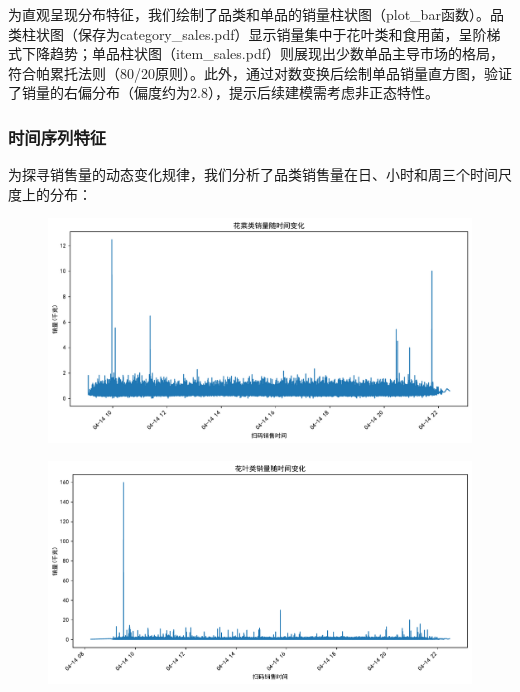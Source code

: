\documentclass{cumcmthesis} %
\begin{document}
为直观呈现分布特征，我们绘制了品类和单品的销量柱状图（plot\_bar函数）。品类柱状图（保存为category\_sales.pdf）显示销量集中于花叶类和食用菌，呈阶梯式下降趋势；单品柱状图（item\_sales.pdf）则展现出少数单品主导市场的格局，符合帕累托法则（80/20原则）。此外，通过对数变换后绘制单品销量直方图，验证了销量的右偏分布（偏度约为2.8），提示后续建模需考虑非正态特性。

\subsubsection{时间序列特征}
为探寻销售量的动态变化规律，我们分析了品类销售量在日、小时和周三个时间尺度上的分布：


\begin{figure}[H]
    \centering
    \begin{minipage}[c]{0.45\textwidth}
        \centering
        \includegraphics[width=\textwidth]{fig/花菜_sales.pdf}
        \label{fig:sample-figure-a}
    \end{minipage}
    \hfill
    \begin{minipage}[c]{0.45\textwidth}
        \centering
        \includegraphics[width=\textwidth]{fig/花叶_sales.pdf}
        \label{fig:sample-figure-b}
    \end{minipage}
    \vspace{1em} %
    

\end{figure}
\end{document}
